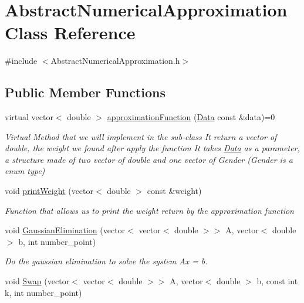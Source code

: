 \hypertarget{class_abstract_numerical_approximation}{}\section{Abstract\+Numerical\+Approximation Class Reference}
\label{class_abstract_numerical_approximation}


{\ttfamily \#include $<$Abstract\+Numerical\+Approximation.\+h$>$}

\subsection*{Public Member Functions}
\begin{DoxyCompactItemize}
\item 
virtual vector$<$ double $>$ \mbox{\hyperlink{class_abstract_numerical_approximation_aaf647fb522cf0d424d31a67230e19a62}{approximation\+Function}} (\mbox{\hyperlink{struct_data}{Data}} const \&data)=0
\begin{DoxyCompactList}\small\item\em Virtual Method that we will implement in the sub-\/class It return a vector of double, the weight we found after apply the function It takes \mbox{\hyperlink{struct_data}{Data}} as a parameter, a structure made of two vector of double and one vector of Gender (Gender is a enum type) \end{DoxyCompactList}\item 
void \mbox{\hyperlink{class_abstract_numerical_approximation_a841c83a7ae9f2146001581f3a7f8444a}{print\+Weight}} (vector$<$ double $>$ const \&weight)
\begin{DoxyCompactList}\small\item\em Function that allows us to print the weight return by the approximation function \end{DoxyCompactList}\item 
void \mbox{\hyperlink{class_abstract_numerical_approximation_a0e92dead9d1cc73d2e4e8c9eed2b7437}{Gaussian\+Elimination}} (vector$<$ vector$<$ double $>$$>$ A, vector$<$ double $>$ b, int number\+\_\+point)
\begin{DoxyCompactList}\small\item\em Do the gaussian elimination to solve the system Ax = b. \end{DoxyCompactList}\item 
void \mbox{\hyperlink{class_abstract_numerical_approximation_add3b93192d2decefc61151c2be292701}{Swap}} (vector$<$ vector$<$ double $>$$>$ A, vector$<$ double $>$ b, const int k, int number\+\_\+point)

\end{DoxyCompactItemize}
